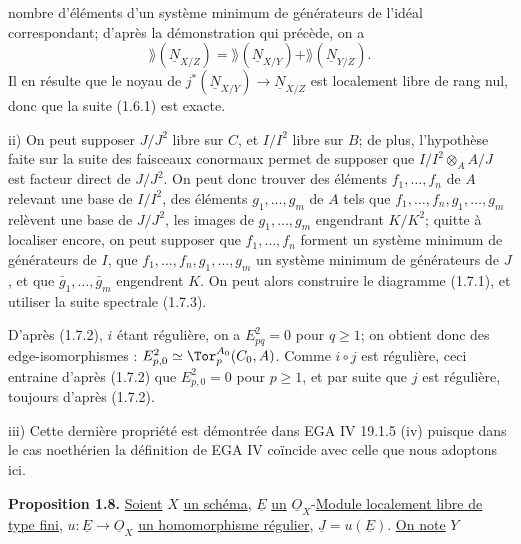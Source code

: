 
nombre d'éléments d'un système minimum de générateurs de l'idéal correspondant; d'après la démonstration qui précède, on a
\[
 \rang(\underline{N}_{X/Z})=\rang(\underline{N}_{X/Y})+\rang(\underline{N}_{Y/Z}).
\]
Il en résulte que le noyau de $j^*(\underline{N}_{X/Y})\longrightarrow \underline{N}_{X/Z}$ est localement libre de rang nul, donc que la suite (1.6.1) est exacte.

ii) On peut supposer $J/J^2$ libre sur $C$, et $I/I^2$ libre sur $B$; de plus, l'hypothèse faite sur la suite des faisceaux conormaux permet de supposer que $I/I^2\otimes_A A/J$ est facteur direct de $J/J^2$. On peut donc trouver des éléments $f_1,\ldots,f_n$ de $A$ relevant une base de $I/I^2$, des éléments $g_1,\ldots,g_m$ de $A$ tels que $f_1,\ldots,f_n,g_1,\ldots,g_m$ relèvent une base de $J/J^2$, les images de $g_1,\ldots,g_m$ engendrant $K/K^2$; quitte à localiser encore, on peut supposer que $f_1,\ldots,f_n$ forment un système minimum de générateurs de $I$, que $f_1,\ldots,f_n,g_1,\ldots,g_m$ un système minimum de générateurs de $J$, et que $\bar g_1,\ldots,\bar g_m$ engendrent $K$. On peut alors construire le diagramme (1.7.1), et utiliser la suite spectrale (1.7.3).

D'après (1.7.2), $i$ étant régulière, on a $E^2_{pq}=0$ pour $q\geq1$; on obtient donc des edge-isomorphismes : $E^2_{p,0}\simeq\Tor_p^{A_0}(C_0,A)$. Comme $i\circ j$ est régulière, ceci entraine d'après (1.7.2) que $E^2_{p,0}=0$ pour $p\geq1$, et par suite que $j$ est régulière, toujours d'après (1.7.2).

iii) Cette dernière propriété est démontrée dans EGA IV 19.1.5 (iv) puisque dans le cas noethérien la définition de EGA IV coïncide avec celle que nous adoptons ici.

\textbf{Proposition 1.8.} \uline{Soient} \(X\) \uline{un schéma}, \(\underline{E}\) \uline{un} \(\underline{O}_X\)-\uline{Module localement libre de type fini}, \(u:\underline{E}\to\underline{O}_X\) \uline{un homomorphisme régulier}, \(\underline{J}=u(\underline{E})\). \uline{On note} \(Y\)

